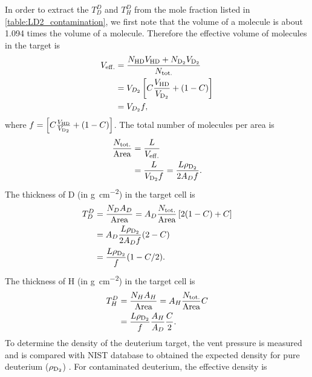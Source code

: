 \documentclass[../main.tex]{subfiles}
\begin{document}
In order to extract the $T_D^D$ and $T^D_H$ from the mole fraction listed in \cref{table:LD2_contamination},
we first note that the volume of a  molecule is about \num{1.094} times the volume of a 
molecule. Therefore the effective volume of molecules in the target is
\begin{equation}
	\begin{split}
		V_{\mathrm{eff.}}&=\frac{N_{\ce{HD}} V_{\ce{HD}} + N_{\ce{D_2}} V_{\ce{D_2}}}{N_{\text{tot.}}}\\
		&=V_{D_2} \left[ C \frac{V_{\ce{HD}}}{V_{\ce{D_2}}} + (1-C) \right]\\
		&=V_{D_2} f,
	\end{split}
\end{equation}
where $f=\left[ C \frac{V_{\ce{HD}}}{V_{\ce{D_2}}} + (1-C) \right]$.
The total number of molecules per area is
\begin{equation}
	\begin{split}
		\frac{N_{\mathrm{tot.}}}{\mathrm{Area}} &= \frac{L}{V_{\mathrm{eff.}}}\\
		&= \frac{L}{V_{\ce{D_2}}f}=\frac{L\rho_{\ce{D_2}}}{2A_Df}.
	\end{split}
\end{equation}
The thickness of D (in \unit{\g\per\cm\squared}) in the target cell is
\begin{equation}
	\begin{split}
		T_D^D &= \frac{N_D A_D}{\mathrm{Area}} = A_D\frac{N_{\mathrm{tot.}}}{\mathrm{Area}} \left[ 2(1-C) + C \right]\\
		&=A_D \frac{L\rho_{\ce{D_2}}}{2A_Df}(2-C)\\
		&=\frac{L\rho_{\ce{D_2}}}{f}(1-C/2).
	\end{split}
\end{equation}
The thickness of H (in \unit{\g\per\cm\squared}) in the target cell is
\begin{equation}
	\begin{split}
		T^D_H &= \frac{N_H A_H}{\mathrm{Area}} = A_H\frac{N_{\mathrm{tot.}}}{\mathrm{Area}}C\\
		&=\frac{L\rho_{\ce{D_2}}}{f}\frac{A_H}{A_D}\frac{C}{2}.
	\end{split}
	\label{eq:TDH}
\end{equation}
To determine the density of the deuterium target, the vent pressure is measured and is compared
with NIST database to obtained the expected density for pure deuterium ($\rho_{\ce{D_2}}$) \cite{density-1453}.
For contaminated deuterium, the effective density is
\end{document}
